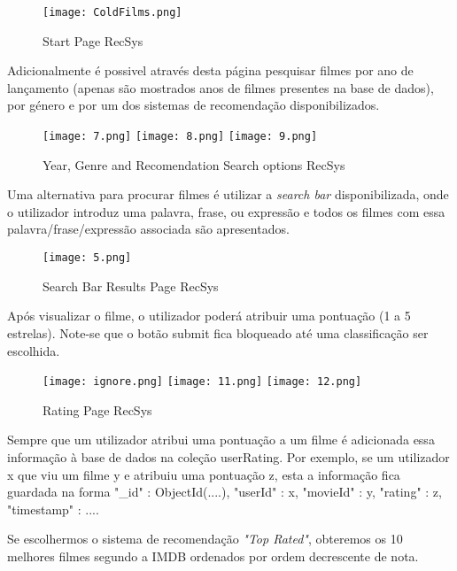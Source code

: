 \begin{figure}[H]
\centering
\texttt{[image: ColdFilms.png]}
\caption {Start Page RecSys}
\label {fig10}
\end{figure}

Adicionalmente é possivel através desta página pesquisar filmes por ano de lançamento (apenas são mostrados anos de filmes presentes na base de dados), por género e por um dos sistemas de recomendação disponibilizados.\newline


\begin{figure}[H]
\centering
\texttt{[image: 7.png]}
\texttt{[image: 8.png]}
\texttt{[image: 9.png]}
\caption {Year, Genre and Recomendation Search options RecSys}
\label {fig11}
\end{figure}

Uma alternativa para procurar filmes é utilizar a \textit{search bar} disponibilizada, onde o utilizador introduz uma palavra, frase, ou expressão e todos os filmes com essa palavra/frase/expressão associada são apresentados.\newline

\begin{figure}[H]
\centering
\texttt{[image: 5.png]}
\caption {Search Bar Results Page RecSys}
\label {fig12}
\end{figure}

Após visualizar o filme, o utilizador poderá atribuir uma pontuação (1 a 5 estrelas). Note-se que o botão submit fica bloqueado até uma classificação ser escolhida.

\begin{figure}[H]
\centering
\texttt{[image: ignore.png]}
\texttt{[image: 11.png]}
\texttt{[image: 12.png]}
\caption {Rating Page RecSys}
\label {fig13}
\end{figure}


Sempre que um utilizador atribui uma pontuação a um filme é adicionada essa informação à base de dados na coleção userRating. Por exemplo, se um utilizador x que viu um filme y e atribuiu uma pontuação z, esta a informação fica guardada na forma {"\_id" : ObjectId(....), "userId" : x, "movieId" : y, "rating" : z, "timestamp" : ...}.\newline


\par Se escolhermos o sistema de recomendação \textit{"Top Rated"}, obteremos os 10 melhores filmes segundo a IMDB ordenados por ordem decrescente de nota.\newline


